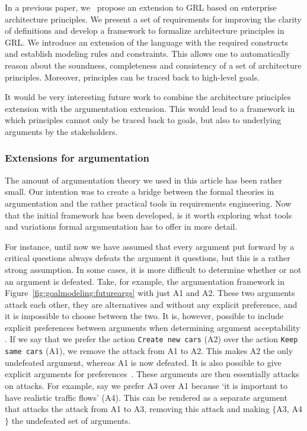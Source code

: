 In a previous paper, we~\cite{marosin-etal:caise2016} propose an extension to GRL based on enterprise architecture principles. We present a set of requirements for improving the clarity of definitions and develop a framework to formalize architecture principles in GRL. We introduce an extension of the language with the required constructs and establish modeling rules and constraints. This allows one to automatically reason about the soundness, completeness and consistency of a set of architecture principles. Moreover, principles can be traced back to high-level goals.

It would be very interesting future work to combine the architecture principles extension with the argumentation extension. This would lead to a framework in which principles cannot only be traced back to goals, but also to underlying arguments by the stakeholders.

\subsubsection*{Extensions for argumentation}

The amount of argumentation theory we used in this article has been rather small. Our intention was to create a bridge between the formal theories in argumentation and the rather practical tools in requirements engineering. Now that the initial framework has been developed, is it worth exploring what tools and variations formal argumentation has to offer in more detail.

For instance, until now we have assumed that every argument put forward by a critical questions always defeats the argument it questions, but this is a rather strong assumption.  In some cases, it is more difficult to determine whether or not an argument is defeated. Take, for example, the argumentation framework in Figure~\ref{fig:goalmodeling:futureargs} with just A1 and A2. These two arguments attack each other, they are alternatives and without any explicit preference, and it is impossible to choose between the two. It is, however, possible to include explicit preferences between arguments when determining argument acceptability \cite{amgoud2002reasoning}. If we say that we prefer the action  \texttt{Create new cars} (A2) over the action  \texttt{Keep same cars} (A1), we remove the attack from A1 to A2. This makes A2 the only undefeated argument, whereas A1 is now defeated. It is also possible to give explicit arguments for preferences~\cite{modgil2009}. These arguments are then essentially attacks on attacks. For example, say we prefer A3 over A1 because `it is important to have realistic traffic flows' (A4). This can be rendered as a separate argument that attacks the attack from A1 to A3, removing this attack and making $\{$A3, A4$\}$ the undefeated set of arguments.

